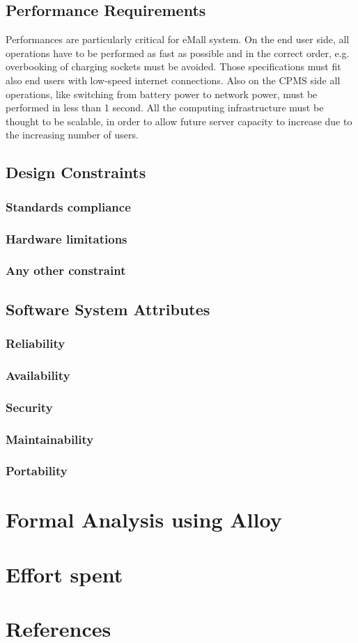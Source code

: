 \documentclass[a4paper]{report}
\begin{document}
\section{Performance Requirements}
Performances are particularly critical for eMall system. On the end user side, all operations have to be performed as fast as possible and in the correct order, e.g. overbooking of charging sockets must be avoided. Those specifications must fit also end users with low-speed internet connections. Also on the CPMS side all operations, like switching from battery power to network power, must be performed in less than 1 second. All the computing infrastructure must be thought to be scalable, in order to allow future server capacity to increase due to the increasing number of users.

\section{Design Constraints}
\subsection{Standards compliance}
\subsection{Hardware limitations}
\subsection{Any other constraint}

\section{Software System Attributes}
\subsection{Reliability}
\subsection{Availability}
\subsection{Security}
\subsection{Maintainability}
\subsection{Portability}

\chapter{Formal Analysis using Alloy}

\chapter{Effort spent}


\chapter{References}
\end{document}
